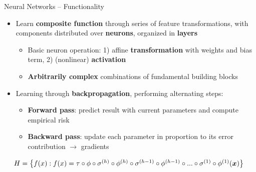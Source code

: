 \setdraft

\begin{frame}{Neural Networks -- Functionality}

 
 

\medskip

\begin{itemize}
  \item Learn \textbf{composite function} through series of feature 
  transformations, with components distributed over \textbf{neurons}, organized 
  in \textbf{layers}
  \begin{itemize}
    \item Basic neuron operation: 1) affine \textbf{transformation} with 
    weights and bias term, 
    2) (nonlinear) \textbf{activation}
    \item \textbf{Arbitrarily complex} combinations of fundamental building 
    blocks
  \end{itemize}
  \item Learning through \textbf{backpropagation}, performing alternating steps:
  \begin{itemize}
    \item \textbf{Forward pass}: predict result with current parameters and 
    compute empirical risk 
    \item \textbf{Backward pass}: update each parameter in proportion to its 
    error contribution $\rightarrow$ gradients
  \end{itemize}
\end{itemize}

\medskip
 
 ~~
$H = \left\{ f(x): f(x) = \tau \circ \phi \circ \sigma^{(h)} \circ
\phi^{(h)} \circ \sigma^{(h - 1)} \circ \phi^{(h - 1)} \circ ... \circ 
\sigma^{(1)} \circ \phi^{(1)} (\bm{x}) \right\}$

\smallskip


\end{frame}
